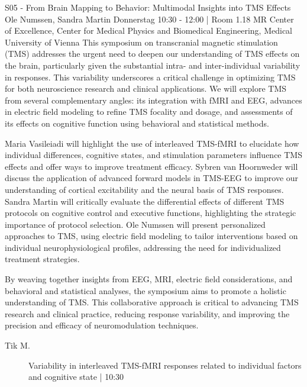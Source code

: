 
            \begin{symposium}
            {S05 - From Brain Mapping to Behavior: Multimodal Insights into TMS Effects}
            { Ole Numssen, Sandra Martin}
            {Donnerstag 10:30 - 12:00 | Room 1.18}
            {MR Center of Excellence, Center for Medical Physics and Biomedical Engineering, Medical University of Vienna}
            This symposium on transcranial magnetic stimulation (TMS) addresses the urgent need to deepen our understanding of TMS effects on the brain, particularly given the substantial intra- and inter-individual variability in responses. This variability underscores a critical challenge in optimizing TMS for both neuroscience research and clinical applications. We will explore TMS from several complementary angles: its integration with fMRI and EEG, advances in electric field modeling to refine TMS focality and dosage, and assessments of its effects on cognitive function using behavioral and statistical methods.

Maria Vasileiadi will highlight the use of interleaved TMS-fMRI to elucidate how individual differences, cognitive states, and stimulation parameters influence TMS effects and offer ways to improve treatment efficacy. Sybren van Hoornweder will discuss the application of advanced forward models in TMS-EEG to improve our understanding of cortical excitability and the neural basis of TMS responses. Sandra Martin will critically evaluate the differential effects of different TMS protocols on cognitive control and executive functions, highlighting the strategic importance of protocol selection. Ole Numssen will present personalized approaches to TMS, using electric field modeling to tailor interventions based on individual neurophysiological profiles, addressing the need for individualized treatment strategies.

By weaving together insights from EEG, MRI, electric field considerations, and behavioral and statistical analyses, the symposium aims to promote a holistic understanding of TMS. This collaborative approach is critical to advancing TMS research and clinical practice, reducing response variability, and improving the precision and efficacy of neuromodulation techniques.
            \begin{description}    
            
                \item [ Tik M.] Variability in interleaved TMS­-fMRI responses related to individual factors and cognitive state \textcolor{mygray}{ | 10:30}    
                

\end{description}
\end{symposium}
